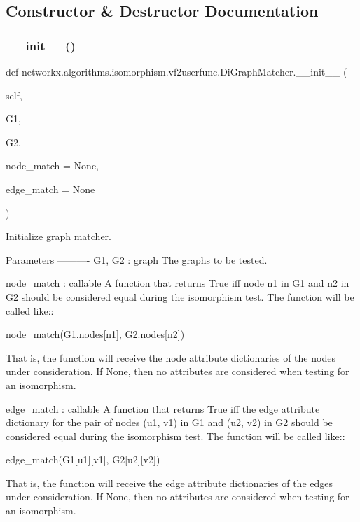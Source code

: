 \subsection{Constructor \& Destructor Documentation}
\mbox{\label{classnetworkx_1_1algorithms_1_1isomorphism_1_1vf2userfunc_1_1DiGraphMatcher_a3ab15e97a93ee0fdfd19d74d631dcf72}} 
\subsubsection{\texorpdfstring{\+\_\+\+\_\+init\+\_\+\+\_\+()}{\_\_init\_\_()}}
{\footnotesize\ttfamily def networkx.\+algorithms.\+isomorphism.\+vf2userfunc.\+Di\+Graph\+Matcher.\+\_\+\+\_\+init\+\_\+\+\_\+ (\begin{DoxyParamCaption}\item[{}]{self,  }\item[{}]{G1,  }\item[{}]{G2,  }\item[{}]{node\+\_\+match = {\ttfamily None},  }\item[{}]{edge\+\_\+match = {\ttfamily None} }\end{DoxyParamCaption})}

\begin{DoxyVerb}Initialize graph matcher.

Parameters
----------
G1, G2 : graph
    The graphs to be tested.

node_match : callable
    A function that returns True iff node n1 in G1 and n2 in G2
    should be considered equal during the isomorphism test. The
    function will be called like::

       node_match(G1.nodes[n1], G2.nodes[n2])

    That is, the function will receive the node attribute dictionaries
    of the nodes under consideration. If None, then no attributes are
    considered when testing for an isomorphism.

edge_match : callable
    A function that returns True iff the edge attribute dictionary for
    the pair of nodes (u1, v1) in G1 and (u2, v2) in G2 should be
    considered equal during the isomorphism test. The function will be
    called like::

       edge_match(G1[u1][v1], G2[u2][v2])

    That is, the function will receive the edge attribute dictionaries
    of the edges under consideration. If None, then no attributes are
    considered when testing for an isomorphism.\end{DoxyVerb}
 

